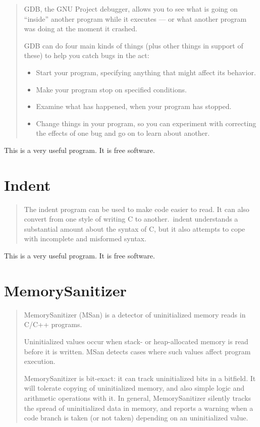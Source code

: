 \documentclass[12pt]{article}
\begin{document}
\begin{quote}
GDB, the GNU Project debugger, allows you to see what is going on
``inside'' another program while it executes --- or what another program
was doing at the moment it crashed.

GDB can do four main kinds of things (plus other things in support
of these) to help you catch bugs in the act:

\begin{itemize}
    \item Start your program, specifying anything that might affect its behavior.
    \item Make your program stop on specified conditions.
    \item Examine what has happened, when your program has stopped.
    \item Change things in your program, so you can experiment
          with correcting the effects of one bug and go on to
          learn about another.
\end{itemize}
\end{quote}

This is a very useful program. It is free software.
\cite{gdb}
\section{Indent}

\begin{quote}
The indent program can be used to make code easier to read. It
can also convert from one style of writing C to another.\ indent
understands a substantial amount about the syntax of C, but it also
attempts to cope with incomplete and misformed syntax.
\end{quote}

This is a very useful program. It is free software.
\cite{indent}
\section{MemorySanitizer}

\begin{quote}
MemorySanitizer (MSan) is a detector of uninitialized memory reads
in C/C++ programs.

Uninitialized values occur when stack- or heap-allocated memory
is read before it is written. MSan detects cases where such values
affect program execution.

MemorySanitizer is bit-exact: it can track uninitialized bits in
a bitfield. It will tolerate copying of uninitialized memory, and
also simple logic and arithmetic operations with it. In general,
MemorySanitizer silently tracks the spread of uninitialized data in
memory, and reports a warning when a code branch is taken (or not
taken) depending on an uninitialized value.
\end{quote}
\end{document}
